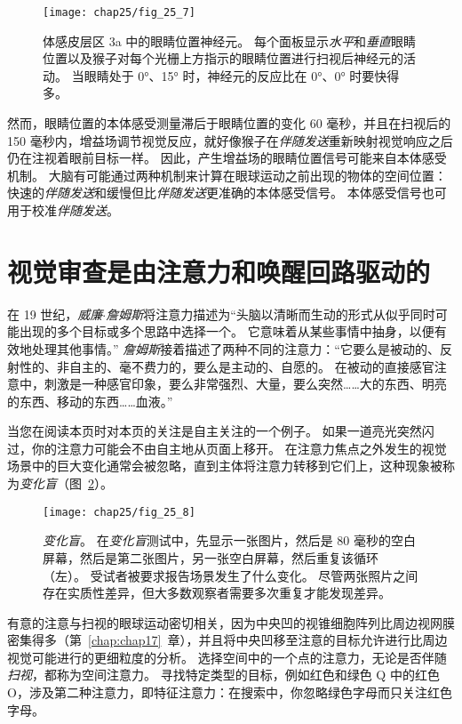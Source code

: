 \begin{figure}[htbp]
	\centering
	\texttt{[image: chap25/fig\_25\_7]}
	\caption{体感皮层区 3a 中的眼睛位置神经元。
		每个面板显示\textit{水平}和\textit{垂直}眼睛位置以及猴子对每个光栅上方指示的眼睛位置进行扫视后神经元的活动。
		当眼睛处于 0°、15° 时，神经元的反应比在 0°、0° 时要快得多。}
	\label{fig:25_7}
\end{figure}


然而，眼睛位置的本体感受测量滞后于眼睛位置的变化 60 毫秒，并且在扫视后的 150 毫秒内，增益场调节视觉反应，就好像猴子在\textit{伴随发送}重新映射视觉响应之后仍在注视着眼前目标一样。
因此，产生增益场的眼睛位置信号可能来自本体感受机制。
大脑有可能通过两种机制来计算在眼球运动之前出现的物体的空间位置：
快速的\textit{伴随发送}和缓慢但比\textit{伴随发送}更准确的本体感受信号。
本体感受信号也可用于校准\textit{伴随发送}。



\section{视觉审查是由注意力和唤醒回路驱动的}

在 19 世纪，\textit{威廉$\cdot$詹姆斯}将注意力描述为“头脑以清晰而生动的形式从似乎同时可能出现的多个目标或多个思路中选择一个。
它意味着从某些事情中抽身，以便有效地处理其他事情。” 
\textit{詹姆斯}接着描述了两种不同的注意力：“它要么是被动的、反射性的、非自主的、毫不费力的，要么是主动的、自愿的。
在被动的直接感官注意中，刺激是一种感官印象，要么非常强烈、大量，要么突然……大的东西、明亮的东西、移动的东西……血液。”


当您在阅读本页时对本页的关注是自主关注的一个例子。
如果一道亮光突然闪过，你的注意力可能会不由自主地从页面上移开。
在注意力焦点之外发生的视觉场景中的巨大变化通常会被忽略，直到主体将注意力转移到它们上，这种现象被称为\textit{变化盲}（图~\ref{fig:25_8}）。


\begin{figure}[htbp]
	\centering
	\texttt{[image: chap25/fig\_25\_8]}
	\caption{\textit{变化盲}。
		在\textit{变化盲}测试中，先显示一张图片，然后是 80 毫秒的空白屏幕，然后是第二张图片，另一张空白屏幕，然后重复该循环（左）。
		受试者被要求报告场景发生了什么变化。
		尽管两张照片之间存在实质性差异，但大多数观察者需要多次重复才能发现差异。}
	\label{fig:25_8}
\end{figure}


有意的注意与扫视的眼球运动密切相关，因为中央凹的视锥细胞阵列比周边视网膜密集得多（第~\ref{chap:chap17}~章），并且将中央凹移至注意的目标允许进行比周边视觉可能进行的更细粒度的分析。
选择空间中的一个点的注意力，无论是否伴随\textit{扫视}，都称为空间注意力。
寻找特定类型的目标，例如红色和绿色 Q 中的红色 O，涉及第二种注意力，即特征注意力：在搜索中，你忽略绿色字母而只关注红色字母。


